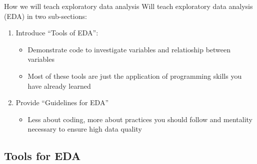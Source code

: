 \documentclass[
  8pt,
  ignorenonframetext,
  dvipsnames]{beamer}
\providecommand{\tightlist}{%
  \setlength{\itemsep}{0pt}\setlength{\parskip}{0pt}}
\let\olditem\item
\renewcommand{\item}{%
  \olditem\vspace{4pt}
}
\begin{document}
\begin{frame}{How we will teach exploratory data analysis}
\protect\hypertarget{how-we-will-teach-exploratory-data-analysis}{}
Will teach exploratory data analysis (EDA) in two sub-sections:

\begin{enumerate}
\tightlist
\item
  Introduce ``Tools of EDA'':

  \begin{itemize}
  \tightlist
  \item
    Demonstrate code to investigate variables and relatioship between
    variables
  \item
    Most of these tools are just the application of programming skills
    you have already learned
  \end{itemize}
\item
  Provide ``Guidelines for EDA''

  \begin{itemize}
  \tightlist
  \item
    Less about coding, more about practices you should follow and
    mentality necessary to ensure high data quality
  \end{itemize}
\end{enumerate}
\end{frame}

\hypertarget{tools-for-eda}{%
\subsection{Tools for EDA}\label{tools-for-eda}}
\end{document}
